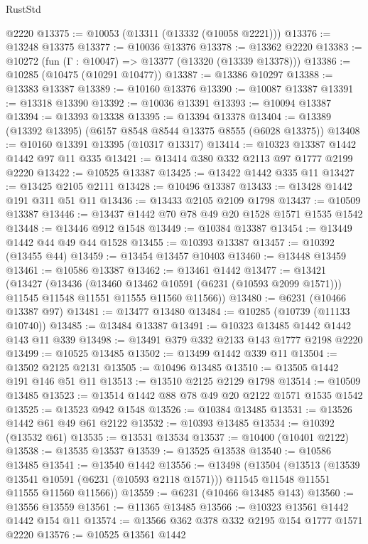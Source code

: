 \begin{lexlean}{RustStd}
\begin{coremodule}
{{    @2220
@13375 := @10053 (@13311 (@13332 (@10058 @2221)))
@13376 := @13248 @13375
@13377 := @10036 @13376
@13378 := @13362 @2220
@13383 := @10272 (fun (Γ : @10047) => @13377 (@13320 (@13339 @13378)))
@13386 := @10285 (@10475 (@10291 @10477))
@13387 := @13386 @10297
@13388 := @13383 @13387
@13389 := @10160 @13376
@13390 := @10087 @13387
@13391 := @13318 @13390
@13392 := @10036 @13391
@13393 := @10094 @13387
@13394 := @13393 @13338
@13395 := @13394 @13378
@13404 := @13389 (@13392 @13395) (@6157 @8548 @8544 @13375 @8555 (@6028 @13375))
@13408 := @10160 @13391 @13395 (@10317 @13317)
@13414 := @10323 @13387 @1442 @1442 @97 @11 @335
@13421 := @13414 @380 @332 @2113 @97 @1777 @2199 @2220
@13422 := @10525 @13387
@13425 := @13422 @1442 @335 @11
@13427 := @13425 @2105 @2111
@13428 := @10496 @13387
@13433 := @13428 @1442 @191 @311 @51 @11
@13436 := @13433 @2105 @2109 @1798
@13437 := @10509 @13387
@13446 := @13437 @1442 @70 @78 @49 @20 @1528 @1571 @1535 @1542
@13448 := @13446 @912 @1548
@13449 := @10384 @13387
@13454 := @13449 @1442 @44 @49 @44 @1528
@13455 := @10393 @13387
@13457 := @10392 (@13455 @44)
@13459 := @13454 @13457 @10403
@13460 := @13448 @13459
@13461 := @10586 @13387
@13462 := @13461 @1442
@13477 := @13421
    (@13427
      (@13436
        (@13460 @13462 @10591 (@6231 (@10593 @2099 @1571)))
        @11545
        @11548
        @11551
        @11555
        @11560
        @11566))
@13480 := @6231 (@10466 @13387 @97)
@13481 := @13477 @13480
@13484 := @10285 (@10739 (@11133 @10740))
@13485 := @13484 @13387
@13491 := @10323 @13485 @1442 @1442 @143 @11 @339
@13498 := @13491 @379 @332 @2133 @143 @1777 @2198 @2220
@13499 := @10525 @13485
@13502 := @13499 @1442 @339 @11
@13504 := @13502 @2125 @2131
@13505 := @10496 @13485
@13510 := @13505 @1442 @191 @146 @51 @11
@13513 := @13510 @2125 @2129 @1798
@13514 := @10509 @13485
@13523 := @13514 @1442 @88 @78 @49 @20 @2122 @1571 @1535 @1542
@13525 := @13523 @942 @1548
@13526 := @10384 @13485
@13531 := @13526 @1442 @61 @49 @61 @2122
@13532 := @10393 @13485
@13534 := @10392 (@13532 @61)
@13535 := @13531 @13534
@13537 := @10400 (@10401 @2122)
@13538 := @13535 @13537
@13539 := @13525 @13538
@13540 := @10586 @13485
@13541 := @13540 @1442
@13556 := @13498
    (@13504
      (@13513
        (@13539 @13541 @10591 (@6231 (@10593 @2118 @1571)))
        @11545
        @11548
        @11551
        @11555
        @11560
        @11566))
@13559 := @6231 (@10466 @13485 @143)
@13560 := @13556 @13559
@13561 := @11365 @13485
@13566 := @10323 @13561 @1442 @1442 @154 @11
@13574 := @13566 @362 @378 @332 @2195 @154 @1777 @1571 @2220
@13576 := @10525 @13561 @1442
}}
\end{coremodule}
\end{lexlean}
